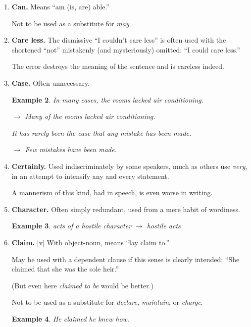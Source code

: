 \documentclass{book}
\numberwithin{equation}{section}
\newtheorem{example}{Example}[chapter]
\begin{document}
\begin{enumerate}
\begin{example}
        $\to$ Our country seemed almost wholly unprepared for war, but it had vast resources.
        
        Within a year it had created an army of 4 million.
    \end{example}
    \item \textbf{Can.} Means ``am (is, are) able.''
    
    Not to be used as a substitute for \textit{may}.
    \item \textbf{Care less.} The dismissive ``I couldn't care less'' is often used with the shortened ``not'' mistakenly (and mysteriously) omitted: ``I could care less.''
    
    The error destroys the meaning of the sentence and is careless indeed.
    \item \textbf{Case.} Often unnecessary.
    \begin{example}
        In many cases, the rooms lacked air conditioning.
        
        $\to$ Many of the rooms lacked air conditioning.
        
        It has rarely been the case that any mistake has been made.
        
        $\to$ Few mistakes have been made.
    \end{example}
    \item \textbf{Certainly.} Used indiscriminately by some speakers, much as others use \textit{very}, in an attempt to intensify any and every statement.
    
    A mannerism of this kind, bad in speech, is even worse in writing.
    \item \textbf{Character.} Often simply redundant, used from a mere habit of wordiness.
    \begin{example}
        acts of a hostile character $\to$ hostile acts
    \end{example}
    \item \textbf{Claim.} [v] With object-noun, means ``lay claim to.''
    
    May be used with a dependent clause if this sense is clearly intended: ``She claimed that she was the sole heir.''
    
    (But even here \textit{claimed to be} would be better.)
    
    Not to be used as a substitute for \textit{declare, maintain}, or \textit{charge}.
    \begin{example}
        He claimed he knew how.
        

\end{example}
\end{enumerate}
\end{document}
